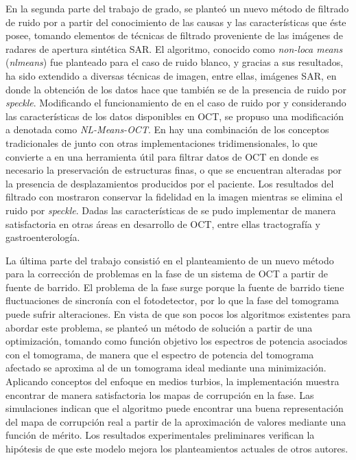 En la segunda parte del trabajo de grado, se planteó un nuevo método de filtrado de ruido por \speckle a partir del conocimiento de las causas y las características que éste posee, tomando elementos de técnicas de filtrado proveniente de las imágenes de radares de apertura sintética SAR. El algoritmo, conocido como \textit{non-loca means} (\textit{nlmeans}) fue planteado para el caso de ruido blanco, y gracias a sus resultados, ha sido extendido a diversas técnicas de imagen, entre ellas, imágenes SAR, en donde la obtención de los datos hace que también se de la presencia de ruido por \textit{speckle}. Modificando el funcionamiento de \nlmeans en el caso de ruido por \speckle y considerando las características de los datos disponibles en OCT, se propuso una modificación a \nlmeans denotada como \textit{NL-Means-OCT}. En \nlmeansOCT hay una combinación de los conceptos tradicionales de \nlmeans junto con otras implementaciones tridimensionales, lo que convierte a \nlmeansOCT en una herramienta útil para filtrar datos de OCT en donde es necesario la preservación de estructuras finas, o que se encuentran alteradas por la presencia de desplazamientos producidos por el paciente. Los resultados del filtrado con \nlmeansOCT mostraron conservar la fidelidad en la imagen mientras se elimina el ruido por \textit{speckle}. Dadas las características de \nlmeansOCT se pudo implementar de manera satisfactoria en otras áreas en desarrollo de OCT, entre ellas tractografía y gastroenterología.

La última parte del trabajo consistió en el planteamiento de un nuevo método para la corrección de problemas en la fase de un sistema de OCT a partir de fuente de barrido. El problema de la fase surge porque la fuente de barrido tiene fluctuaciones de sincronía con el fotodetector, por lo que la fase del tomograma puede sufrir alteraciones. En vista de que son pocos los algoritmos existentes para abordar este problema, se planteó un método de solución a partir de una optimización, tomando como función objetivo los espectros de potencia asociados con el tomograma, de manera que el espectro de potencia del tomograma afectado se aproxima al de un tomograma ideal mediante una minimización. Aplicando conceptos del enfoque en medios turbios, la implementación muestra encontrar de manera satisfactoria los mapas de corrupción en la fase. Las simulaciones indican que el algoritmo puede encontrar una buena representación del mapa de corrupción real a partir de la aproximación de valores mediante una función de mérito. Los resultados experimentales preliminares verifican la hipótesis de que este modelo mejora los planteamientos actuales de otros autores.

